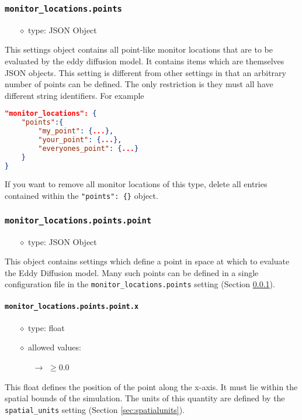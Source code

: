 \documentclass[]{article}
\def\code#1{\texttt{#1}}
\begin{document}
\subsubsection{\code{monitor\_locations.points}}\label{sec:monpoints}
\begin{itemize}
    \item[$\diamond$] type: JSON Object 
\end{itemize}
This settings object contains all point-like monitor locations that are to be
evaluated by the eddy diffusion model. It contains items which
are themselves JSON objects. This setting is different from other settings in
that an arbitrary number of points can be defined. The only restriction is they
must all have different string identifiers. For example\\
\begin{lstlisting}[language=json,firstnumber=1]
"monitor_locations": {
    "points":{
        "my_point": {...},
        "your_point": {...},
        "everyones_point": {...}
    }
}
\end{lstlisting}
\medskip

\noindent If you want to remove all monitor locations of this type, delete all
entries contained within the \code{"points": \{\}} object.

\subsubsection{\code{monitor\_locations.points.point}}
\begin{itemize}
    \item[$\diamond$] type: JSON Object 
\end{itemize}
This object contains settings which define a point in space at which to evaluate
the Eddy Diffusion model. Many such points can be defined in a
single configuration file in the \code{monitor\_locations.points} setting (Section
\ref{sec:monpoints}).

\paragraph{\code{monitor\_locations.points.point.x}}
\begin{itemize}
    \item[$\diamond$] type: float 
    \item[$\diamond$] allowed values:
    \begin{itemize}
        \item[$\rightarrow$] $\geq0.0$
    \end{itemize}
\end{itemize}
This float defines the position of the point along the x-axis. It must lie
within the spatial bounds of the simulation. The units of this quantity are
defined by the \code{spatial\_units} setting (Section \ref{sec:spatialunits}).
\end{document}
